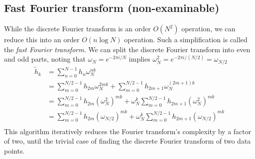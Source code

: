 \subsection{Fast Fourier transform (non-examinable)}
While the discrete Fourier transform is an order $O(N^2)$ operation, we can reduce this into an order $O(n \log N)$ operation.
Such a simplification is called the \textit{fast Fourier transform}.
We can split the discrete Fourier transform into even and odd parts, noting that $\omega_N = e^{-2\pi i / N}$ implies $\omega_N^2 = e^{-2 \pi i / (N/2)} = \omega_{N/2}$
\begin{align*}
	\widetilde h_k & = \sum_{n=0}^{N-1} h_n \omega_N^{nk}                                                                           \\
    & = \sum_{m=0}^{N/2-1} h_{2m} \omega_N^{2mk} + \sum_{m=0}^{N/2-1} h_{2m + 1} \omega_N^{(2m+1)k}                  \\
    & = \sum_{m=0}^{N/2-1} h_{2m} (\omega_N^2)^{mk} + \omega_N^k \sum_{m=0}^{N/2-1} h_{2m + 1} (\omega_N^2)^{mk}     \\
    & = \sum_{m=0}^{N/2-1} h_{2m} (\omega_{N/2})^{mk} + \omega_N^k \sum_{m=0}^{N/2-1} h_{2m + 1} (\omega_{N/2})^{mk} \\
\end{align*}
This algorithm iteratively reduces the Fourier transform's complexity by a factor of two, until the trivial case of finding the discrete Fourier transform of two data points.